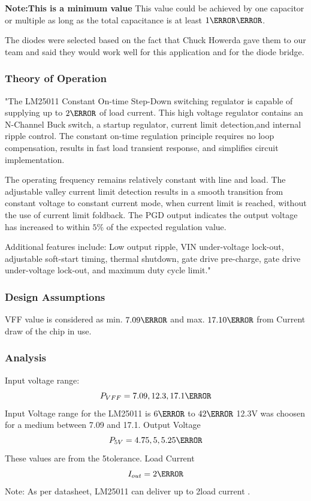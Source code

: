 \textbf{Note:This is a minimum value} This value could be achieved by one capacitor or multiple as long as the total capacitance is at least $1\milli\farad$.

The diodes were selected based on the fact that Chuck Howerda gave them to our team and said they would work well for this application and for the diode bridge.

 

\subsubsection{Theory of Operation}
"The LM25011 Constant On-time Step-Down switching regulator is capable of supplying up to $2\ampere$ of load current. This high voltage regulator contains an N-Channel Buck switch, a startup regulator, current limit detection,and internal ripple control. The constant on-time regulation principle requires no loop compensation, results in fast load transient response, and simplifies circuit implementation.


The operating frequency remains relatively constant with line and load. The adjustable valley current limit detection results in a smooth transition from constant voltage to constant current mode, when current limit is reached, without the use of current limit foldback. The PGD output indicates the output voltage has increased to within $5\percent$ of the expected regulation value.

Additional features include: Low output ripple, VIN under-voltage lock-out, adjustable soft-start timing, thermal shutdown, gate drive pre-charge, gate drive under-voltage lock-out, and maximum duty cycle limit."\cite{LM25011}
\subsubsection{Design Assumptions}
 VFF value is considered as min. $7.09\volt$ and max. $17.10\volt$ from Current draw of the chip in use.
\subsubsection{Analysis}
\begin{outline}[enumerate]
\1 Input voltage range:
\begin{equation}
P_{VFF}=7.09, 12.3, 17.1 \volt
\end{equation}
\2 Input Voltage range for the LM25011 is $6\volt$ to $42\volt$ 12.3V was choosen for a medium between 7.09 and 17.1.
\1 Output Voltage
\begin{equation}
P_{5V}=4.75, 5, 5.25 \volt
\end{equation}
\2 These values are from the 5\percent tolerance. 
\1 Load Current
\begin{equation}
I_{out}=2\ampere
\end{equation}
\2 Note: As per datasheet, LM25011 can deliver up to 2\ampere load current \cite{LM25011}.
\end{outline}


